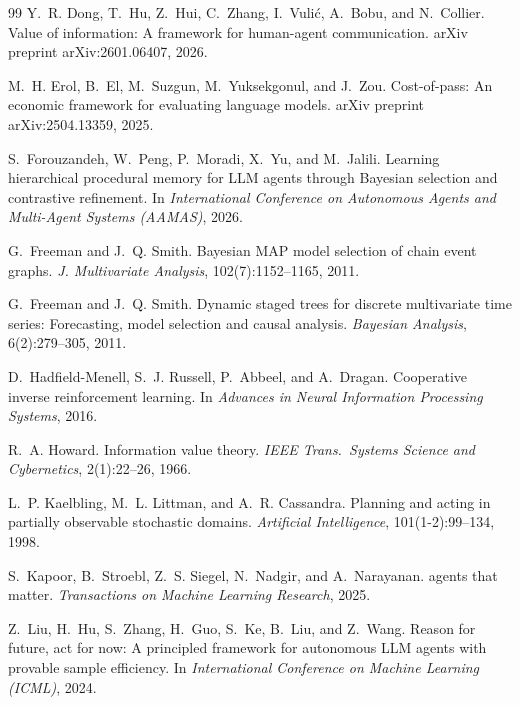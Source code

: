 \documentclass[11pt]{article}
\begin{document}
\begin{thebibliography}{99}
Y.~R. Dong, T.~Hu, Z.~Hui, C.~Zhang, I.~Vuli\'{c}, A.~Bobu, and N.~Collier.
\newblock Value of information: A framework for human-agent communication.
\newblock arXiv preprint arXiv:2601.06407, 2026.

M.~H. Erol, B.~El, M.~Suzgun, M.~Yuksekgonul, and J.~Zou.
\newblock Cost-of-pass: An economic framework for evaluating language models.
\newblock arXiv preprint arXiv:2504.13359, 2025.

S.~Forouzandeh, W.~Peng, P.~Moradi, X.~Yu, and M.~Jalili.
\newblock Learning hierarchical procedural memory for {LLM} agents through {B}ayesian selection and contrastive refinement.
\newblock In \emph{International Conference on Autonomous Agents and Multi-Agent Systems (AAMAS)}, 2026.

G.~Freeman and J.~Q. Smith.
\newblock Bayesian {MAP} model selection of chain event graphs.
\newblock \emph{J. Multivariate Analysis}, 102(7):1152--1165, 2011.

G.~Freeman and J.~Q. Smith.
\newblock Dynamic staged trees for discrete multivariate time series: Forecasting, model selection and causal analysis.
\newblock \emph{Bayesian Analysis}, 6(2):279--305, 2011.

D.~Hadfield-Menell, S.~J. Russell, P.~Abbeel, and A.~Dragan.
\newblock Cooperative inverse reinforcement learning.
\newblock In \emph{Advances in Neural Information Processing Systems}, 2016.

R.~A. Howard.
\newblock Information value theory.
\newblock \emph{IEEE Trans.\ Systems Science and Cybernetics}, 2(1):22--26, 1966.

L.~P. Kaelbling, M.~L. Littman, and A.~R. Cassandra.
\newblock Planning and acting in partially observable stochastic domains.
\newblock \emph{Artificial Intelligence}, 101(1-2):99--134, 1998.

S.~Kapoor, B.~Stroebl, Z.~S. Siegel, N.~Nadgir, and A.~Narayanan.
 agents that matter.
\newblock \emph{Transactions on Machine Learning Research}, 2025.

Z.~Liu, H.~Hu, S.~Zhang, H.~Guo, S.~Ke, B.~Liu, and Z.~Wang.
\newblock Reason for future, act for now: A principled framework for autonomous {LLM} agents with provable sample efficiency.
\newblock In \emph{International Conference on Machine Learning (ICML)}, 2024.


\end{thebibliography}
\end{document}
